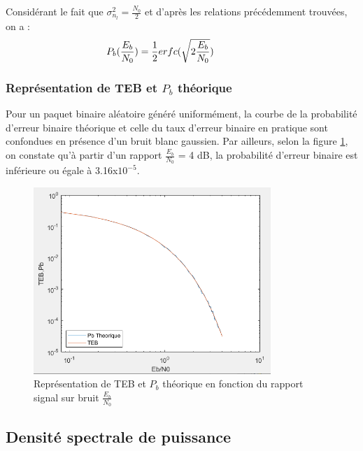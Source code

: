 \documentclass{rapport}
\begin{document}
{Considérant le fait que $\sigma_{n_l}^2 = \frac{N_0}2$ et d'après les relations précédemment trouvées, on a :
\begin{align}
    \mathllap{P_b(\frac{E_b}{N_0})} &=\frac12erfc(\sqrt{2\frac{E_b}{N_0}})
\end{align}

\subsubsection{\large Représentation de TEB et $P_b$ théorique}
Pour un paquet binaire aléatoire généré uniformément, la courbe de la probabilité d'erreur binaire théorique et celle du taux d'erreur binaire en pratique sont confondues en présence d'un bruit blanc gaussien. Par ailleurs, selon la figure \ref{pb_teb}, on constate qu'à partir d'un rapport $ \frac{E_b}{N_0} $ = 4 dB, la probabilité d'erreur binaire est inférieure ou égale à 3.16x$10^{-5}$.
\begin{figure}[H]
    \centering
    \includegraphics[width=0.8\textwidth]{logos/Pb_TEB.PNG}
    \caption{Représentation de TEB et $P_b$ théorique en fonction du rapport signal sur bruit $ \frac{E_b}{N_0} $}
    \label{pb_teb}
\end{figure}
\subsection{\Large Densité spectrale de puissance}
}
\end{document}
